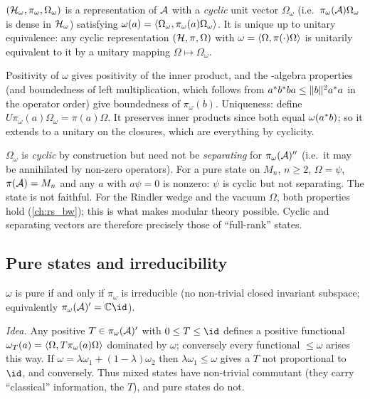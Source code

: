 \begin{theorem}[GNS]\label{thm:GNS}
$(\mathcal{H}_\omega,\pi_\omega,\Omega_\omega)$ is a representation of $\mathcal{A}$ with a \emph{cyclic} unit vector $\Omega_\omega$ (i.e.\ $\pi_\omega(\mathcal{A})\Omega_\omega$ is dense in $\mathcal{H}_\omega$) satisfying $\omega(a)=\langle \Omega_\omega,\pi_\omega(a)\Omega_\omega\rangle$. It is unique up to unitary equivalence: any cyclic representation $(\mathcal{H},\pi,\Omega)$ with $\omega=\langle \Omega,\pi(\cdot)\Omega\rangle$ is unitarily equivalent to it by a unitary mapping $\Omega\mapsto\Omega_\omega$.
\end{theorem}

\begin{proofsketch}
Positivity of $\omega$ gives positivity of the inner product, and the \cstar-algebra properties (and boundedness of left multiplication, which follows from $a^{*} b^{*} ba\le\lVert b\rVert^2a^{*} a$ in the operator order) give boundedness of $\pi_\omega(b)$. Uniqueness: define $U\pi_\omega(a)\Omega_\omega=\pi(a)\Omega$. It preserves inner products since both equal $\omega(a^{*} b)$; so it extends to a unitary on the closures, which are everything by cyclicity.
\end{proofsketch}

\begin{whatwrong}
$\Omega_\omega$ is \emph{cyclic} by construction but need not be \emph{separating} for $\pi_\omega(\mathcal{A})''$ (i.e.\ it may be annihilated by non-zero operators). For a pure state on $M_n$, $n\ge2$, $\Omega=\psi$, $\pi(\mathcal{A})=M_n$ and any $a$ with $a\psi=0$ is nonzero: $\psi$ is cyclic but not separating. The state is not faithful. For the Rindler wedge and the vacuum $\Omega$, both properties hold (\cref{ch:rs_bw}); this is what makes modular theory possible. Cyclic and separating vectors are therefore precisely those of ``full-rank'' states.
\end{whatwrong}

\subsection{Pure states and irreducibility}

\begin{theorem}
$\omega$ is pure if and only if $\pi_\omega$ is irreducible (no non-trivial closed invariant subspace; equivalently $\pi_\omega(\A)'=\C\id$).
\end{theorem}
\emph{Idea.} Any positive $T\in\pi_\omega(\mathcal{A})'$ with $0\le T\le\id$ defines a positive functional $\omega_T(a)=\langle \Omega,T\pi_\omega(a)\Omega\rangle$ dominated by $\omega$; conversely every functional $\le\omega$ arises this way. If $\omega=\lambda\omega_1+(1-\lambda)\omega_2$ then $\lambda\omega_1\le\omega$ gives a $T$ not proportional to $\id$, and conversely. Thus mixed states have non-trivial commutant (they carry ``classical'' information, the $T$), and pure states do not.

